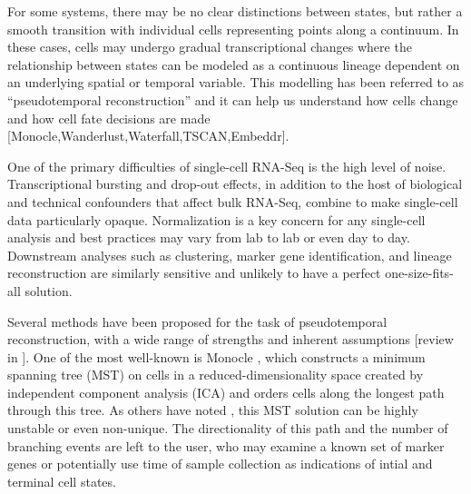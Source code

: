 \documentclass[11pt]{article}\usepackage[]{graphicx}\usepackage[]{color}
\begin{document}
For some systems, there may be no clear distinctions between states, but rather a smooth transition with individual cells representing points along a continuum. In these cases, cells may undergo gradual transcriptional changes where the relationship between states can be modeled as a continuous lineage dependent on an underlying spatial or temporal variable. This modelling has been referred to as ``pseudotemporal reconstruction'' and it can help us understand how cells change and how cell fate decisions are made \citep{Bendalletal14,Campbelletal15,Ji&Ji16,Shinetal15,Trapnelletal14}[Monocle,Wanderlust,Waterfall,TSCAN,Embeddr].

One of the primary difficulties of single-cell RNA-Seq is the high level of noise. Transcriptional bursting and drop-out effects, in addition to the host of biological and technical confounders that affect bulk RNA-Seq, combine to make single-cell data particularly opaque. Normalization is a key concern for any single-cell analysis and best practices may vary from lab to lab or even day to day. Downstream analyses such as clustering, marker gene identification, and lineage reconstruction are similarly sensitive and unlikely to have a perfect one-size-fits-all solution. 

Several methods have been proposed for the task of pseudotemporal reconstruction, with a wide range of strengths and inherent assumptions [review in \citet{Bacher&Kendziorski16}]. One of the most well-known is Monocle \citep{Trapnelletal14}, which constructs a minimum spanning tree (MST) on cells in a reduced-dimensionality space created by independent component analysis (ICA) and orders cells along the longest path through this tree. As others have noted \citet{Shinetal15}, this MST solution can be highly unstable or even non-unique. The directionality of this path and the number of branching events are left to the user, who may examine a known set of marker genes or potentially use time of sample collection as indications of intial and terminal cell states.

\end{document}
